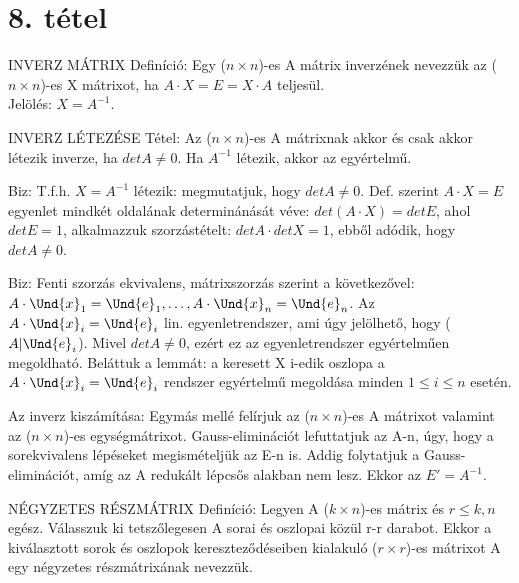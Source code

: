 \section{8. tétel}

\begin{definicio}{
INVERZ MÁTRIX Definíció}: Egy ($n \times n$)-es A mátrix inverzének nevezzük az ($n \times n$)-es X mátrixot, ha $A \cdot X = E = X \cdot A$ teljesül.\\
Jelölés: $X = A^{-1}$.
\end{definicio}
\begin{tetel}{
INVERZ LÉTEZÉSE Tétel}: Az ($n \times n$)-es A mátrixnak akkor és csak akkor létezik inverze, ha $detA \neq 0$. Ha $A^{-1}$ létezik, akkor az egyértelmű.
\end{tetel}
\begin{leftbar}
Biz: T.f.h. $X = A^{-1}$ létezik: megmutatjuk, hogy $detA \neq 0$. Def. szerint $A \cdot X = E$ egyenlet mindkét oldalának determinánását véve: $det(A \cdot X) = detE$, ahol $detE = 1$, alkalmazzuk szorzástételt: $detA \cdot detX = 1$, ebből adódik, hogy $detA \neq 0$.
\end{leftbar}
\begin{leftbar}
Biz: Fenti szorzás ekvivalens, mátrixszorzás szerint a következővel: $A \cdot \Und{x}_1 = \Und{e}_1, \ldots, A \cdot \Und{x}_n = \Und{e}_n$. Az $A\cdot \Und{x}_i = \Und{e}_i$ lin. egyenletrendszer, ami úgy jelölhető, hogy ($A|\Und{e}_i$). Mivel $detA \neq 0$, ezért ez az egyenletrendszer egyértelműen megoldható. Beláttuk a lemmát: a keresett X i-edik oszlopa a $A\cdot \Und{x}_i = \Und{e}_i$ rendszer egyértelmű megoldása minden $1 \leq i \leq n$ esetén.
\end{leftbar}
Az inverz kiszámítása: Egymás mellé felírjuk az ($n \times n$)-es A mátrixot valamint az ($n \times n$)-es egységmátrixot. Gauss-eliminációt lefuttatjuk az A-n, úgy, hogy a sorekvivalens lépéseket megismételjük az E-n is. Addig folytatjuk a Gauss-eliminációt, amíg az A redukált lépcsős alakban nem lesz. Ekkor az $E' = A^{-1}$.
\begin{definicio}{
NÉGYZETES RÉSZMÁTRIX Definíció}: Legyen A ($k \times n$)-es mátrix és $r \leq k,n$ egész. Válasszuk ki tetszőlegesen A sorai és oszlopai közül r-r darabot. Ekkor a kiválasztott sorok és oszlopok kereszteződéseiben kialakuló ($r \times r$)-es mátrixot A egy négyzetes részmátrixának nevezzük.
\end{definicio}
